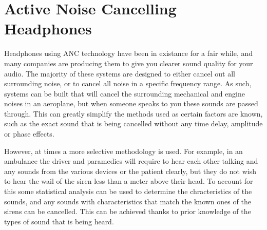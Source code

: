 \section{Active Noise Cancelling Headphones}
Headphones using ANC technology have been in existance for a fair while, and many companies are producing them to give you clearer sound quality for your audio.
The majority of these systems are designed to either cancel out all surrounding noise, or to cancel all noise in a specific frequency range.
As such, systems can be built that will cancel the surrounding mechanical and engine noises in an aeroplane, but when someone speaks to you these sounds are passed through.
This can greatly simplify the methods used as certain factors are known, such as the exact sound that is being cancelled without any time delay, amplitude or phase effects.

However, at times a more selective methodology is used. For example, in an ambulance the driver and paramedics will require to hear each other talking and any sounds from the various devices or the patient clearly, but they do not wish to hear the wail of the siren less than a meter above their head.
To account for this some statistical analysis can be used to determine the chracteristics of the sounds, and any sounds with characteristics that match the known ones of the sirens can be cancelled.
This can be achieved thanks to prior knowledge of the types of sound that is being heard.
